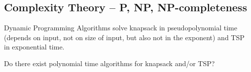 \begin{lec}[2012-12-15]\end{lec}

\subsection*{Complexity Theory -- P, NP, NP-completeness}

Dynamic Programming Algorithms solve knapsack in pseudopolynomial time
(depends on input, not on size of input, but also not in the exponent) and
TSP in exponential time.

\begin{qstn}
Do there exist polynomial time algorithms for knapsack and/or TSP?
\end{qstn}


